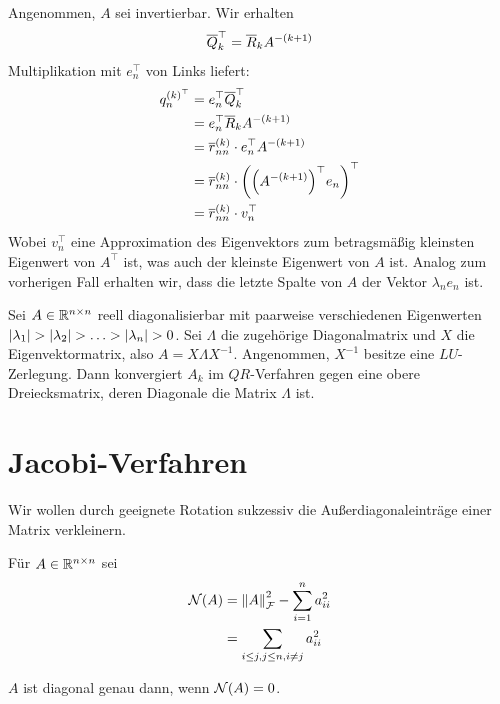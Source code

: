 \documentclass{report}
\begin{document}
	Angenommen, $A$ sei invertierbar. Wir erhalten
	\begin{align*}
		\overline{{Q}}_k^\top = \overline{{R}}_k A^{-(k+1)}
	\end{align*}
	Multiplikation mit $e_n^\top$ von Links liefert:
	\begin{align*}
		q_n^{(k)^\top} &= e_n^\top \overline{{Q}}_k^\top \\
				       &= e_n^\top \overline{{R}}_k A^{-(k+1)}\\
				       &= \overline{{r}}_{nn}^{(k)} \cdot e_n^\top A^{-(k+1)}\\
				       &= \overline{{r}}_{nn}^{(k)} \cdot \qty(\qty(A^{-(k+1)})^\top e_n)^\top\\
				       &= \overline{{r}}_{nn}^{(k)} \cdot v_n^\top
	\end{align*}
	Wobei $v_n^\top$ eine Approximation des Eigenvektors zum betragsmäßig kleinsten Eigenwert von $A^\top$ ist, was auch der kleinste Eigenwert von $A$ ist. Analog zum vorherigen Fall erhalten wir, dass die letzte Spalte von $A$ der Vektor $\lambda_n e_n$ ist.
	\begin{theorem}
		Sei $A \in \mathbb{R}^{n \times n}$ reell diagonalisierbar mit paarweise verschiedenen Eigenwerten $\abs{\lambda_1} > \abs{\lambda_2} > \hdots > \abs{\lambda_n} > 0$. Sei $\Lambda$ die zugehörige Diagonalmatrix und $X$ die Eigenvektormatrix, also $A = X \Lambda X^{-1}$. Angenommen, $X^{-1}$ besitze eine $LU$-Zerlegung. Dann konvergiert $A_k$ im $QR$-Verfahren gegen eine obere Dreiecksmatrix, deren Diagonale die Matrix $\Lambda$ ist.
	\end{theorem}
	\section{Jacobi-Verfahren}
	Wir wollen durch geeignete Rotation sukzessiv die Außerdiagonaleinträge einer Matrix verkleinern.
	\begin{definition}
		Für $A \in \mathbb{R}^{n \times n}$ sei
		\begin{align*}
			\mathcal{N}(A) &= \norm{A}_{\mathcal{F}}^2 - \sum_{i = 1}^n a_{ii}^2\\
			&= \sum_{i \leq j, j \leq n, i \neq j} a_{ii}^2
		\end{align*}
	\end{definition}
	$A$ ist diagonal genau dann, wenn $\mathcal{N}(A) = 0$. 
	
\end{document}
